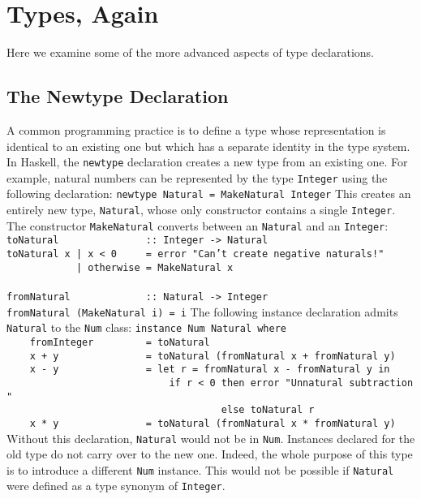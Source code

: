 \section{Types, Again}

Here we examine some of the more advanced aspects of type
declarations.  

\subsection{The Newtype Declaration}

A common programming practice is to define a type whose representation
is identical to an existing one but which has a separate identity in
the type system.  
In Haskell, the \mbox{\tt newtype} declaration creates a new type from an
existing one.  For example, natural numbers can be represented by
the type \mbox{\tt Integer} using the following declaration:
\bprog
\mbox{\tt newtype\ Natural\ =\ MakeNatural\ Integer}
\eprog
This creates an entirely new type, \mbox{\tt Natural}, whose only
constructor contains a single \mbox{\tt Integer}.  The constructor \mbox{\tt MakeNatural} 
converts between an \mbox{\tt Natural} and an \mbox{\tt Integer}:
\bprog
\mbox{\tt toNatural\ \ \ \ \ \ \ \ \ \ \ \ \ \ \ ::\ Integer\ ->\ Natural}\\
\mbox{\tt toNatural\ x\ |\ x\ <\ 0\ \ \ \ \ =\ error\ "Can't\ create\ negative\ naturals!"\ }\\
\mbox{\tt \ \ \ \ \ \ \ \ \ \ \ \ |\ otherwise\ =\ MakeNatural\ x}\\
\mbox{\tt }\\[-8pt]
\mbox{\tt fromNatural\ \ \ \ \ \ \ \ \ \ \ \ \ ::\ Natural\ ->\ Integer}\\
\mbox{\tt fromNatural\ (MakeNatural\ i)\ =\ i}
\eprog
The 
following instance declaration admits \mbox{\tt Natural} to the \mbox{\tt Num} class:
\bprog
\mbox{\tt instance\ Num\ Natural\ where}\\
\mbox{\tt \ \ \ \ fromInteger\ \ \ \ \ \ \ \ \ =\ toNatural}\\
\mbox{\tt \ \ \ \ x\ +\ y\ \ \ \ \ \ \ \ \ \ \ \ \ \ \ =\ toNatural\ (fromNatural\ x\ +\ fromNatural\ y)}\\
\mbox{\tt \ \ \ \ x\ -\ y\ \ \ \ \ \ \ \ \ \ \ \ \ \ \ =\ let\ r\ =\ fromNatural\ x\ -\ fromNatural\ y\ in}\\
\mbox{\tt \ \ \ \ \ \ \ \ \ \ \ \ \ \ \ \ \ \ \ \ \ \ \ \ \ \ \ \ if\ r\ <\ 0\ then\ error\ "Unnatural\ subtraction"}\\
\mbox{\tt \ \ \ \ \ \ \ \ \ \ \ \ \ \ \ \ \ \ \ \ \ \ \ \ \ \ \ \ \ \ \ \ \ \ \ \ \ else\ toNatural\ r}\\
\mbox{\tt \ \ \ \ x\ *\ y\ \ \ \ \ \ \ \ \ \ \ \ \ \ \ =\ toNatural\ (fromNatural\ x\ *\ fromNatural\ y)}
\eprog
Without this declaration, \mbox{\tt Natural} would not be in \mbox{\tt Num}.  Instances
declared for the old type do not carry over to the new one.  Indeed,
the whole purpose of this type is to introduce a different \mbox{\tt Num}
instance.  This would not be possible if \mbox{\tt Natural} were
defined as a type synonym of \mbox{\tt Integer}.  

